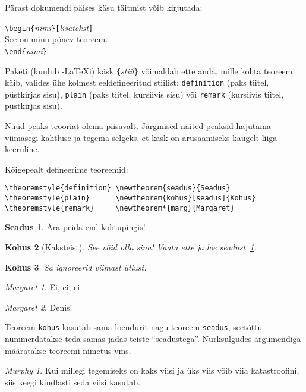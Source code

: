 Pärast dokumendi päises käsu  täitmist võib kirjutada:
\begin{code}
\verb|\begin{|\emph{nimi}\verb|}[|\emph{lisatekst}\verb|]|\\
See on minu põnev teoreem.\\
\verb|\end{|\emph{nimi}\verb|}|
\end{code}

Paketi  (kuulub \AmS-\LaTeX i) käsk
\verb|{|\emph{stiil}\verb|}| võimaldab ette anda, mille
kohta teoreem käib, valides ühe kolmest eeldefineeritud stiilist:
\texttt{definition} (paks tiitel, püstkirjas sisu), \texttt{plain} (paks
tiitel, kursiivis sisu) või \texttt{remark} (kursiivis tiitel,
püstkirjas sisu).

Nüüd peaks teooriat olema piisavalt. Järgmised näited peaksid hajutama
viimasegi kahtluse ja tegema selgeks, et käsk  on
arusaamiseks kaugelt liiga keeruline.

\theoremstyle{definition} \newtheorem{seadus}{Seadus}
\theoremstyle{plain}      \newtheorem{kohus}[seadus]{Kohus}
\theoremstyle{remark}     \newtheorem*{marg}{Margaret}

Kõigepealt defineerime teoreemid:

\begin{verbatim}
\theoremstyle{definition} \newtheorem{seadus}{Seadus}
\theoremstyle{plain}      \newtheorem{kohus}[seadus]{Kohus}
\theoremstyle{remark}     \newtheorem*{marg}{Margaret}
\end{verbatim}

\begin{example}
\begin{seadus} \label{seadus:pink}
Ära peida end kohtupingis!
\end{seadus}
\begin{kohus}[Kaksteist]
See võid olla sina! Vaata ette
ja loe seadust~\ref{seadus:pink}.
\end{kohus}
\begin{kohus}
Sa ignoreerid viimast ütlust.
\end{kohus}
\begin{marg}Ei, ei, ei\end{marg}
\begin{marg}Denis!\end{marg}
\end{example}

Teoreem \texttt{kohus} kasutab sama loendurit nagu teoreem
\texttt{seadus}, seetõttu nummerdatakse teda samas jadas teiste
"`seadustega"'. Nurksulgudes argumendiga määratakse teoreemi nimetus
vms.
\begin{example}
\newtheorem{mur}{Murphy}[section]

\begin{mur}
Kui millegi tegemiseks on kaks
viisi ja üks viis võib viia
katastroofini, siis keegi
kindlasti seda viisi kasutab.
\end{mur}
\end{example}

